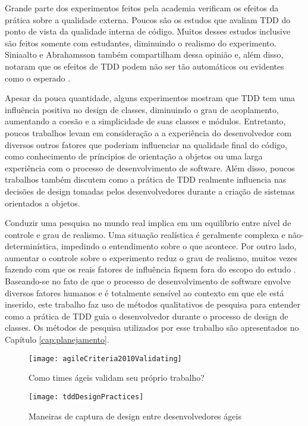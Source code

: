 Grande parte dos experimentos feitos pela academia verificam os
efeitos da prática sobre a qualidade externa. Poucos são os estudos que avaliam TDD do
ponto de vista da qualidade interna de código. Muitos desses estudos
inclusive são feitos somente com estudantes, diminuindo o realismo do experimento. 
Siniaalto e Abrahamsson também
compartilham dessa opinião e, além disso, notaram que os efeitos de TDD podem 
não ser tão automáticos ou evidentes como o esperado \cite{alarming-results}.

Apesar da pouca quantidade, alguns experimentos mostram que TDD tem uma influência
positiva no design de classes, diminuindo o grau de acoplamento, aumentando
a coesão e a simplicidade de suas classes e módulos. Entretanto, poucos trabalhos
levam em consideração a a experiência do desenvolvedor com diversos
outros fatores que poderiam influenciar na qualidade final do código, como conhecimento
de príncipios de orientação a objetos ou uma larga experiência com o processo de 
desenvolvimento de software. Além disso, poucos trabalhos também discutem como
a prática de TDD realmente influencia 
nas decisões de design tomadas pelos desenvolvedores durante a criação de sistemas 
orientados a objetos.

Conduzir uma pesquisa no mundo real implica em um equilíbrio entre
nível de controle e grau de realismo. Uma situação realística é geralmente complexa e 
não-determinística, impedindo o entendimento sobre o que acontece. Por outro
lado, aumentar o controle sobre o experimento reduz o grau de realismo, muitos
vezes fazendo com que os reais fatores de influência fiquem fora do escopo do 
estudo \cite{guidelines-case-study}.
Baseando-se no fato de que o processo de desenvolvimento de software envolve 
diversos fatores humanos e é totalmente sensível ao contexto em que ele está 
inserido, este trabalho faz uso de métodos qualitativos de pesquisa 
para entender como a prática de TDD guia o desenvolvedor durante 
o processo de design de classes.
Os métodos de pesquisa utilizados por
esse trabalho são apresentados no Capítulo \ref{cap:planejamento}.

\begin{figure}[ht]
  \begin{minipage}[b]{0.45\linewidth}
    \centering
    \texttt{[image: agileCriteria2010Validating]}
    \caption{Como times ágeis validam seu próprio trabalho?}
    \label{fig:wambler-agile-2010}
  \end{minipage}
  \hspace{0.5cm}
  \begin{minipage}[b]{0.45\linewidth}
    \centering
    \texttt{[image: tddDesignPractices]}
    \caption{Maneiras de captura de design entre desenvolvedores ágeis}  
    \label{fig:wambler-tdd-2008}
  \end{minipage}
\end{figure}			

